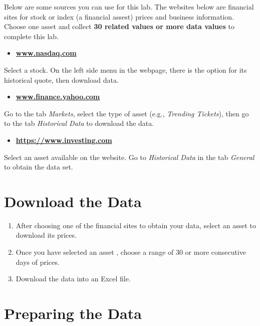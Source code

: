 \documentclass[
]{book}
\providecommand{\tightlist}{%
  \setlength{\itemsep}{0pt}\setlength{\parskip}{0pt}}
\begin{document}
Below are some sources you can use for this lab. The websites below are financial sites for stock or index (a financial assest) prices and business information. Choose one asset and collect \textbf{30 related values or more data values} to complete this lab.

\begin{itemize}
\tightlist
\item
  \href{www.nasdaq.com}{\textbf{www.nasdaq.com}}
\end{itemize}

Select a stock. On the left side menu in the webpage, there is the option for its historical quote, then download data.

\begin{itemize}
\tightlist
\item
  \href{www.finance.yahoo.com}{\textbf{www.finance.yahoo.com}}
\end{itemize}

Go to the tab \emph{Markets}, select the type of asset (e.g., \emph{Trending Tickets}), then go to the tab \emph{Historical Data} to download the data.

\begin{itemize}
\tightlist
\item
  \href{https://www.investing.com}{\textbf{https://www.investing.com}}
\end{itemize}

Select an asset available on the website. Go to \emph{Historical Data} in the tab \emph{General} to obtain the data set.

\hypertarget{download-the-data}{%
\section{Download the Data}\label{download-the-data}}

\begin{enumerate}
\def\labelenumi{\arabic{enumi}.}
\tightlist
\item
  After choosing one of the financial sites to obtain your data, select an asset to download its prices.
\item
  Once you have selected an asset , choose a range of 30 or more consecutive days of prices.
\item
  Download the data into an Excel file.
\end{enumerate}

\hypertarget{preparing-the-data}{%
\section{Preparing the Data}\label{preparing-the-data}}
\end{document}
